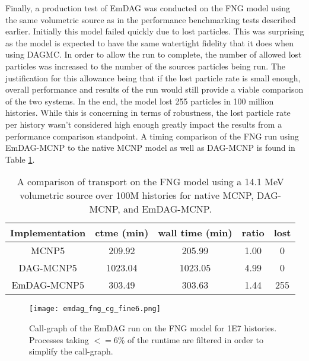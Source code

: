 Finally, a production test of EmDAG was conducted on the FNG model using the
same volumetric source as in the performance benchmarking tests described
earlier. Initially this model failed quickly due to lost particles. This was
surprising as the model is expected to have the same watertight fidelity that it
does when using DAGMC. In order to allow the run to complete, the number of
allowed lost particles was increased to the number of the sources particles
being run. The justification for this allowance being that if the lost
particle rate is small enough, overall performance and results of the run would
still provide a viable comparison of the two systems. In the end, the model lost
255 particles in 100 million histories. While this is concerning in terms of
robustness, the lost particle rate per history wasn't considered high enough
greatly impact the results from a performance comparison standpoint. A timing
comparison of the FNG run using EmDAG-MCNP to the native MCNP model as well as
DAG-MCNP is found in Table \ref{fngemdag}.

\begin{table}[H]
  \small
  \begin{center}
        \begin{tabular}{|c|c|c|c|c|}
      \hline
      \textbf{Implementation} & \textbf{ctme (min)} & \textbf{wall time (min)} & \textbf{ratio} & \textbf{lost} \\
      \hline
      MCNP5 & 209.92 & 205.99 &  1.00 & 0 \\
      \hline
      DAG-MCNP5 & 1023.04 & 1023.05 & 4.99 & 0  \\
      \hline      
      EmDAG-MCNP5 & 303.49 & 303.63 & 1.44 & 255  \\
      \hline
    \end{tabular} 
    \caption[Comparative performance results of EmDAG-MCNP for a production
      model.]{A comparison of transport on the FNG model using a 14.1 MeV
      volumetric source over 100M histories for native MCNP, DAG-MCNP, and
      EmDAG-MCNP.}
    \label{fngemdag}
  \end{center}
\end{table}

\begin{figure}
  \centering
  \texttt{[image: emdag\_fng\_cg\_fine6.png]}
  \caption[Callgraph of a DAGMC simulation.] {Call-graph of the EmDAG run on the
    FNG model for \num{1E7} histories. Processes taking $<=$6\% of the runtime
    are filtered in order to simplify the call-graph.}
  \label{emdag-fng-coarse}  
\end{figure}

